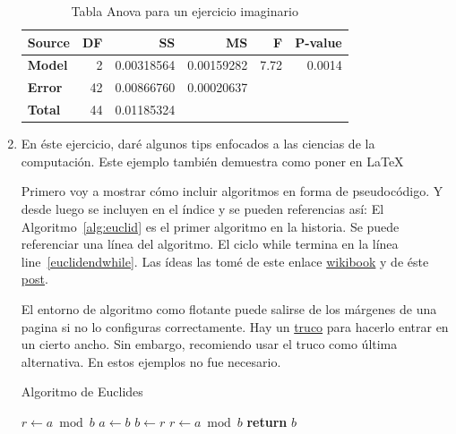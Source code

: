 \begin{enumerate}
\begin{table}[htb]
  \begin{center}
    \begin{tabular}{l | r r r r r}
      \toprule
      Source & \textbf{DF} & \textbf{SS} & \textbf{MS} & \textbf{F} & \textbf{P-value} \\
      \midrule
      \textbf{Model} & 2 & 0.00318564 & 0.00159282 & 7.72 & 0.0014 \\
      \textbf{Error} & 42 & 0.00866760 & 0.00020637 &  & \\
      \midrule
      \textbf{Total} & 44 & 0.01185324 &   &  & \\
      \bottomrule
    \end{tabular}
  \end{center}
\caption{Tabla Anova para un ejercicio imaginario}
\label{tab:exey}
\end{table}

\item En éste ejercicio, daré algunos tips enfocados a las ciencias de la computación.
Este ejemplo también demuestra como poner  en \LaTeX{}

Primero voy a mostrar cómo incluir algoritmos en forma de pseudocódigo.
Y desde luego se incluyen en el índice y se pueden referencias así: 
El Algoritmo~\ref{alg:euclid} es el primer algoritmo en la historia.
Se puede referenciar una línea del algoritmo.
El ciclo while termina en la línea line~\ref{euclidendwhile}.
Las ídeas las tomé de este enlace \href{https://en.wikibooks.org/wiki/LaTeX/Algorithms#Typesetting_using_the_algorithmicx_package}{wikibook} y de éste \href{https://tex.stackexchange.com/questions/229355/algorithm-algorithmic-algorithmicx-algorithm2e-algpseudocode-confused}{post}.

El entorno de algoritmo como flotante puede salirse de los márgenes de una pagina si no lo configuras correctamente.
Hay un \href{https://tex.stackexchange.com/questions/350434/adjust-width-of-algorithm-float}{truco} para hacerlo entrar en un cierto ancho.
Sin embargo, recomiendo usar el truco como última alternativa.
En estos ejemplos no fue necesario.

\begin{algorithm}[H]
\caption{Algoritmo de Euclides}
\label{alg:euclid}
\begin{algorithmic}[1] %
     
    \State $r\gets a \bmod b$
     
        \State $a \gets b$
        \State $b \gets r$
        \State $r \gets a \bmod b$
    \EndWhile\label{euclidendwhile}
    \State \textbf{return} $b$
    \EndProcedure
\end{algorithmic}
\end{algorithm}


\end{enumerate}
